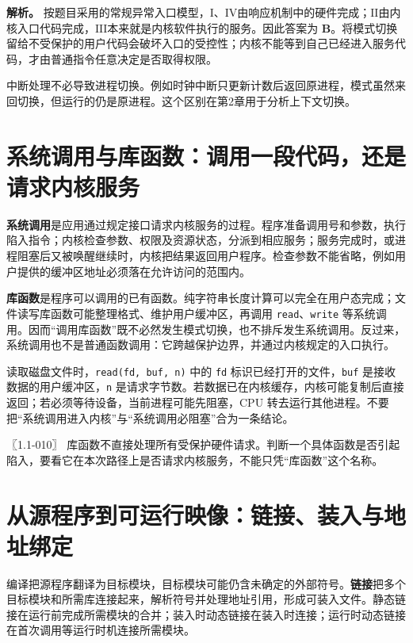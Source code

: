 \textbf{解析。} 按题目采用的常规异常入口模型，\ensuremath{\mathrm{I}}、\ensuremath{\mathrm{IV}}由响应机制中的硬件完成；\ensuremath{\mathrm{II}}由内核入口代码完成，\ensuremath{\mathrm{III}}本来就是内核软件执行的服务。因此答案为 \textbf{B}。将模式切换留给不受保护的用户代码会破坏入口的受控性；内核不能等到自己已经进入服务代码，才由普通指令任意决定是否取得权限。

中断处理不必导致进程切换。例如时钟中断只更新计数后返回原进程，模式虽然来回切换，但运行的仍是原进程。这个区别在第2章用于分析上下文切换。

\section{系统调用与库函数：调用一段代码，还是请求内核服务}\label{OS01-1-5}

\textbf{系统调用}是应用通过规定接口请求内核服务的过程。程序准备调用号和参数，执行陷入指令；内核检查参数、权限及资源状态，分派到相应服务；服务完成时，或进程阻塞后又被唤醒继续时，内核把结果返回用户程序。检查参数不能省略，例如用户提供的缓冲区地址必须落在允许访问的范围内。

\textbf{库函数}是程序可以调用的已有函数。纯字符串长度计算可以完全在用户态完成；文件读写库函数可能整理格式、维护用户缓冲区，再调用 \texttt{read}、\texttt{write} 等系统调用。因而``调用库函数''既不必然发生模式切换，也不排斥发生系统调用。反过来，系统调用也不是普通函数调用：它跨越保护边界，并通过内核规定的入口执行。

读取磁盘文件时，\texttt{read(\allowbreak{}fd,\allowbreak{} buf,\allowbreak{} n)\allowbreak{}} 中的 \texttt{fd} 标识已经打开的文件，\texttt{buf} 是接收数据的用户缓冲区，\texttt{n} 是请求字节数。若数据已在内核缓存，内核可能复制后直接返回；若必须等待设备，当前进程可能先阻塞，CPU 转去运行其他进程。不要把``系统调用进入内核''与``系统调用必阻塞''合为一条结论。

〖1.1-010〗 库函数不直接处理所有受保护硬件请求。判断一个具体函数是否引起陷入，要看它在本次路径上是否请求内核服务，不能只凭``库函数''这个名称。

\section{从源程序到可运行映像：链接、装入与地址绑定}\label{OS01-1-6}

编译把源程序翻译为目标模块，目标模块可能仍含未确定的外部符号。\textbf{链接}把多个目标模块和所需库连接起来，解析符号并处理地址引用，形成可装入文件。静态链接在运行前完成所需模块的合并；装入时动态链接在装入时连接；运行时动态链接在首次调用等运行时机连接所需模块。

